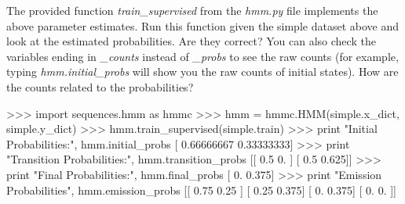 \begin{exercise}
The provided function \emph{train\_supervised} from the \emph{hmm.py} file implements the above parameter estimates.
Run this function given the simple dataset above and look at the estimated probabilities. Are they correct? You can also check the variables ending in \emph{\_counts} instead of \emph{\_probs} to see the raw counts (for example, typing \emph{hmm.initial\_probs} will show you the raw counts of initial states). How are the counts related to the probabilities?

\begin{python}
>>> import sequences.hmm as hmmc
>>> hmm = hmmc.HMM(simple.x_dict, simple.y_dict)
>>> hmm.train_supervised(simple.train)
>>> print "Initial Probabilities:", hmm.initial_probs
[ 0.66666667  0.33333333]
>>> print "Transition Probabilities:", hmm.transition_probs
[[ 0.5    0.   ]
 [ 0.5    0.625]]
>>> print "Final Probabilities:", hmm.final_probs
[ 0.     0.375]
>>> print "Emission Probabilities", hmm.emission_probs
[[ 0.75   0.25 ]
 [ 0.25   0.375]
 [ 0.     0.375]
 [ 0.     0.   ]]
\end{python}
\end{exercise}



